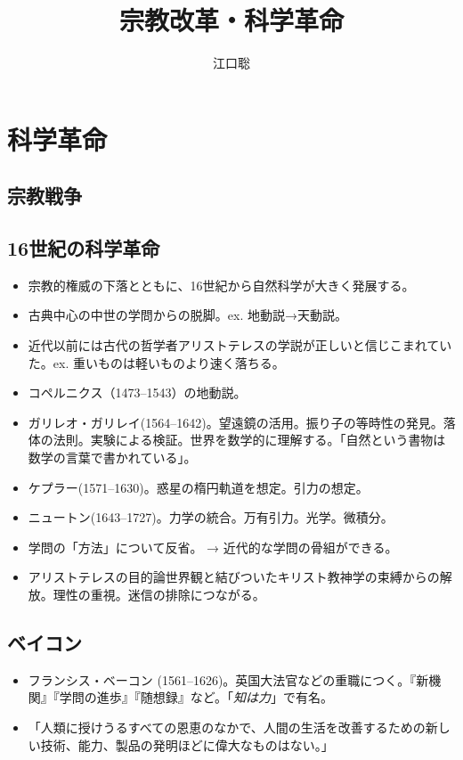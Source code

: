 \documentclass[uplatex,dvipdfmx]{jsarticle}
\author{江口聡}
\title{宗教改革・科学革命}
\begin{document}
\maketitle
\else\chapter{科学革命}\fi


\section{宗教戦争}


\section{16世紀の科学革命}

\begin{itemize}
\item 宗教的権威の下落とともに、16世紀から自然科学が大きく発展する。
\item 古典中心の中世の学問からの脱脚。ex. 地動説→天動説。
\item 近代以前には古代の哲学者アリストテレスの学説が正しいと信じこまれていた。ex. 重いものは軽いものより速く落ちる。
\item コペルニクス（1473--1543）の地動説。
\item ガリレオ・ガリレイ(1564--1642)。望遠鏡の活用。振り子の等時性の発見。落体の法則。実験による検証。世界を数学的に理解する。「自然という書物は数学の言葉で書かれている」。
\item ケプラー(1571--1630)。惑星の楕円軌道を想定。引力の想定。
\item ニュートン(1643--1727)。力学の統合。万有引力。光学。微積分。
\item 学問の「方法」について反省。 → 近代的な学問の骨組ができる。
\item アリストテレスの目的論世界観と結びついたキリスト教神学の束縛からの解放。理性の重視。迷信の排除につながる。
\end{itemize}



\section{ベイコン}

\begin{itemize}
\item フランシス・ベーコン (1561--1626)。英国大法官などの重職につく。『新機関』『学問の進歩』『随想録』など。「\emph{知は力}」で有名。
 \item 「人類に授けうるすべての恩恵のなかで、人間の生活を改善するための新しい技術、能力、製品の発明ほどに偉大なものはない。」
 \end{itemize}
 
\end{document}
